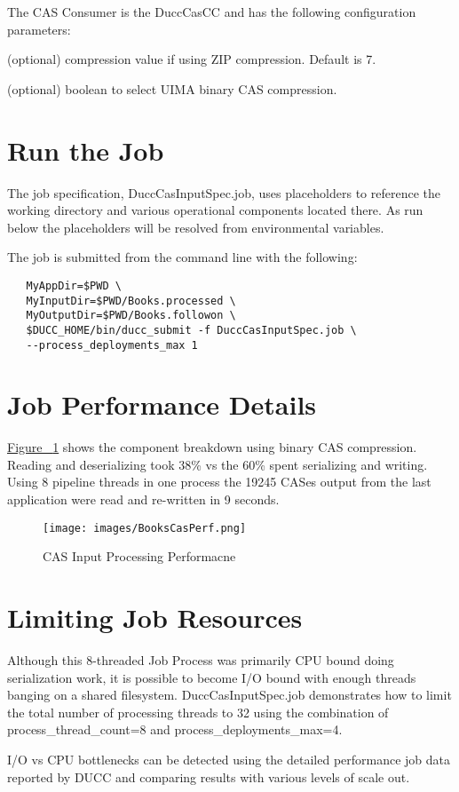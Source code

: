 The CAS Consumer is the DuccCasCC and has the following configuration parameters:

\begin{description}[labelindent=0.5in,leftmargin=0.5in]
  \item[XmiCompressionLevel] (optional) compression value if using ZIP compression. Default is 7.
  \item[UseBinaryCompression] (optional) boolean to select UIMA binary CAS compression.
\end{description}

\section{Run the Job}
The job specification, DuccCasInputSpec.job, uses placeholders to reference the working directory
and various operational components located there. As run below the placeholders will be resolved
from environmental variables. 

The job is submitted from the command line with the following:
\begin{verbatim}
   MyAppDir=$PWD \
   MyInputDir=$PWD/Books.processed \ 
   MyOutputDir=$PWD/Books.followon \
   $DUCC_HOME/bin/ducc_submit -f DuccCasInputSpec.job \
   --process_deployments_max 1
\end{verbatim}

\section{Job Performance Details}
\hyperref[fig:CAS-Input-Processing]{Figure ~\ref{fig:CAS-Input-Processing}} shows the component breakdown
using binary CAS compression. Reading and deserializing took 38\% vs the 60\% spent serializing and writing.
Using 8 pipeline threads in one process the 19245 CASes output from the last application were read and 
re-written in 9 seconds.

\begin{figure}[H]
  \centering
  \texttt{[image: images/BooksCasPerf.png]}
  \caption{CAS Input Processing Performacne}
  \label{fig:CAS-Input-Processing}
\end{figure}

\section{Limiting Job Resources}
Although this 8-threaded Job Process was primarily CPU bound doing serialization work, it is possible to become I/O bound 
with enough threads banging on a shared filesystem.
DuccCasInputSpec.job demonstrates how to limit the total number of processing threads to 32 using the combination 
of process\_thread\_count=8 and process\_deployments\_max=4.

I/O vs CPU bottlenecks can be detected using the detailed performance job data reported by DUCC and comparing results
with various levels of scale out.
